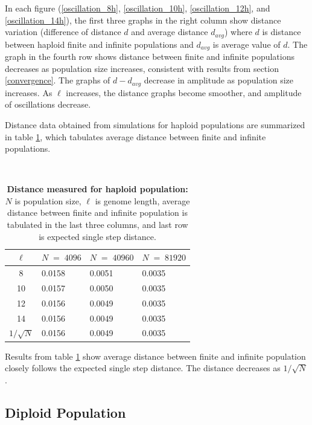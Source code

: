 In each figure (\ref{oscillation_8h}, \ref{oscillation_10h}, \ref{oscillation_12h}, 
and \ref{oscillation_14h}), the first three graphs in the right column show 
distance variation (difference of distance $d$ and average distance $d_{avg}$)  
where $d$ is distance between haploid finite and infinite populations and $d_{avg}$ is average value of $d$. 
The graph in the fourth row shows distance between finite and infinite populations decreases 
as population size increases, consistent with results from section \ref{convergence}. 
The graphs of $d-d_{avg}$ decrease in amplitude as population size increases. 
As $\ell$ increases, the distance graphs become smoother, and amplitude of oscillations decrease. 

Distance data obtained from simulations for haploid populations are summarized in table \ref{tableDistanceOscHap},  
which tabulates average distance between finite and infinite populations. 

\mbox{}\\[-0.5in]
\begin{table}[h]
\caption[\textbf{Distance measured for haploid population}]{\textbf{Distance measured for haploid population:} $N$ is population size, $\ell$ is genome length, 
average distance between finite and infinite population is tabulated in the last three columns, and last row is expected single step distance.}
\centering
\begin{tabularx}{0.75\textwidth}{ c *{3}{X}}
\toprule
$\ell$ & $N \;=\; 4096 $ & $N \;=\; 40960 $ & $N \;=\; 81920 $\\
\midrule
8 & 0.0158 & 0.0051 & 0.0035 \\
10 & 0.0157 & 0.0050 & 0.0035 \\ 
12 & 0.0156 & 0.0049 & 0.0035 \\
14 & 0.0156 & 0.0049 & 0.0035 \\ 
\midrule
$1/\sqrt{N}$ & 0.0156 & 0.0049 & 0.0035 \\
\bottomrule
\end{tabularx}
\label{tableDistanceOscHap}
\end{table}

Results from table \ref{tableDistanceOscHap} show average distance between finite and infinite population closely follows 
the expected single step distance. The distance decreases as $1/\sqrt{N}$.

\clearpage
\subsection{Diploid Population}

